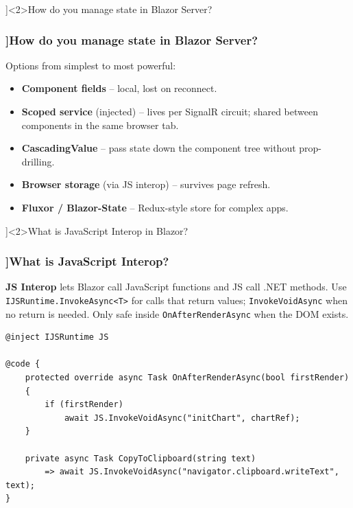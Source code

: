 \QuestionSlide[\CategoryBadge[BlazorColor!20]{Blazor Server}]<2>{How do you manage state in Blazor Server?}

\begin{frame}[fragile]
  \frametitle{\AnswerTitle[\CategoryBadge[BlazorColor!20]{Blazor Server}]{How do you manage state in Blazor Server?}}

  {\footnotesize
  Options from simplest to most powerful:
  \begin{itemize}
    \item \textbf{Component fields} – local, lost on reconnect.
    \item \textbf{Scoped service} (injected) – lives per SignalR circuit; shared between components in the same browser tab.
    \item \textbf{CascadingValue} – pass state down the component tree without prop-drilling.
    \item \textbf{Browser storage} (via JS interop) – survives page refresh.
    \item \textbf{Fluxor / Blazor-State} – Redux-style store for complex apps.
  \end{itemize}
  }
\end{frame}

\QuestionSlide[\CategoryBadge[BlazorColor!20]{Blazor Server}]<2>{What is JavaScript Interop in Blazor?}

\begin{frame}[fragile]
  \frametitle{\AnswerTitle[\CategoryBadge[BlazorColor!20]{Blazor Server}]{What is JavaScript Interop?}}

  {\footnotesize
  \textbf{JS Interop} lets Blazor call JavaScript functions and JS call .NET methods. Use \texttt{IJSRuntime.InvokeAsync<T>} for calls that return values; \texttt{InvokeVoidAsync} when no return is needed. Only safe inside \texttt{OnAfterRenderAsync} when the DOM exists.
  }

  \begin{verbatim}
@inject IJSRuntime JS

@code {
    protected override async Task OnAfterRenderAsync(bool firstRender)
    {
        if (firstRender)
            await JS.InvokeVoidAsync("initChart", chartRef);
    }

    private async Task CopyToClipboard(string text)
        => await JS.InvokeVoidAsync("navigator.clipboard.writeText", text);
}
  \end{verbatim}
\end{frame}

